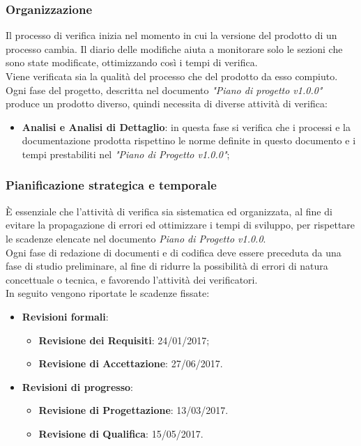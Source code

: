 \documentclass[12pt,a4paper,titlepage]{article}
\begin{document}
	\subsubsection{Organizzazione}
	Il processo di verifica inizia nel momento in cui la versione del prodotto di un processo cambia. Il diario delle modifiche aiuta a monitorare solo le sezioni che sono state modificate, ottimizzando così i tempi di verifica.\\
	Viene verificata sia la qualità del processo che del prodotto da esso compiuto.\\
	Ogni fase del progetto, descritta nel documento \textit{"Piano di progetto v1.0.0"} produce un prodotto diverso, quindi necessita di diverse attività di verifica:
	\begin{itemize}
		\item \textbf{Analisi e Analisi di Dettaglio}: in questa fase si verifica che i processi e la documentazione prodotta rispettino le norme definite in questo documento e i tempi prestabiliti nel \textit{"Piano di Progetto v1.0.0"};
	\end{itemize}
\subsubsection{Pianificazione strategica e temporale}
	È essenziale che l'attività di verifica sia sistematica ed organizzata, al fine di evitare la propagazione di errori ed ottimizzare i tempi di sviluppo, per rispettare le scadenze elencate nel documento \textit{Piano di Progetto v1.0.0}.\\
	Ogni fase di redazione di documenti e di codifica deve essere preceduta da una fase di studio preliminare, al fine di ridurre la possibilità di errori di natura concettuale o tecnica, e favorendo l'attività dei verificatori.\\
	In seguito vengono riportate le scadenze fissate:
	\begin{itemize}
		\item \textbf{Revisioni formali}:
			\begin{itemize}
				\item \textbf{Revisione dei Requisiti}: 24/01/2017;
				\item \textbf{Revisione di Accettazione}: 27/06/2017.
			\end{itemize}
		\item \textbf{Revisioni di progresso}:
			\begin{itemize}
				\item \textbf{Revisione di Progettazione}: 13/03/2017.
				\item \textbf{Revisione di Qualifica}: 15/05/2017.
			\end{itemize}
	\end{itemize}
\end{document}
